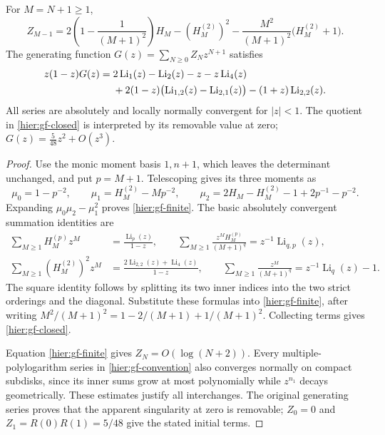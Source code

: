 \begin{theorem}
\label{hier:gf-theorem}
For $M=N+1\ge1$,
\begin{equation}\label{hier:gf-finite}
 \boxed{\displaystyle
 Z_{M-1}=
 2\left(1-\frac1{(M+1)^2}\right)H_M
 -(H_M^{(2)})^2
 -\frac{M^2}{(M+1)^2}\bigl(H_M^{(2)}+1\bigr).}
\end{equation}
The generating function $G(z)=\sum_{N\ge0}Z_Nz^{N+1}$ satisfies
\begin{align}\label{hier:gf-closed}
 z(1-z)G(z)={}&2\operatorname{Li}_1(z)-\operatorname{Li}_2(z)
                 -z-z\operatorname{Li}_4(z)\notag\\
 &+2(1-z)\bigl(\operatorname{Li}_{1,2}(z)
                         -\operatorname{Li}_{2,1}(z)\bigr)
 -(1+z)\operatorname{Li}_{2,2}(z).
\end{align}
All series are absolutely and locally normally convergent for $|z|<1$.
The quotient in \eqref{hier:gf-closed} is interpreted by its removable
value at zero; $G(z)=\tfrac5{48}z^2+O(z^3)$.
\end{theorem}
\begin{proof}
Use the monic moment basis $1,n+1$, which leaves the determinant
unchanged, and put $p=M+1$.  Telescoping gives its three moments as
\[
 \mu_0=1-p^{-2},\qquad
 \mu_1=H_M^{(2)}-Mp^{-2},\qquad
 \mu_2=2H_M-H_M^{(2)}-1+2p^{-1}-p^{-2}.
\]
Expanding $\mu_0\mu_2-\mu_1^2$ proves \eqref{hier:gf-finite}.
The basic absolutely convergent summation identities are
\begin{align*}
 \sum_{M\ge1}H_M^{(p)}z^M
    &=\frac{\operatorname{Li}_p(z)}{1-z},\qquad
 \sum_{M\ge1}\frac{z^M H_M^{(p)}}{(M+1)^q}
    =z^{-1}\operatorname{Li}_{q,p}(z),\\
 \sum_{M\ge1}(H_M^{(2)})^2z^M
    &=\frac{2\operatorname{Li}_{2,2}(z)+\operatorname{Li}_4(z)}{1-z},
 \qquad
 \sum_{M\ge1}\frac{z^M}{(M+1)^q}
    =z^{-1}\operatorname{Li}_q(z)-1.
\end{align*}
The square identity follows by splitting its two inner indices into
the two strict orderings and the diagonal.  Substitute these formulas
into \eqref{hier:gf-finite}, after writing
$M^2/(M+1)^2=1-2/(M+1)+1/(M+1)^2$.  Collecting terms gives
\eqref{hier:gf-closed}.

Equation \eqref{hier:gf-finite} gives $Z_N=O(\log(N+2))$.
Every multiple-polylogarithm series in \eqref{hier:gf-convention}
also converges normally on compact subdisks, since its inner sums
grow at most polynomially while $z^{n_1}$ decays geometrically.
These estimates justify all interchanges.  The original generating
series proves that the apparent singularity at zero is removable;
$Z_0=0$ and $Z_1=R(0)R(1)=5/48$ give the stated initial terms.
\end{proof}

